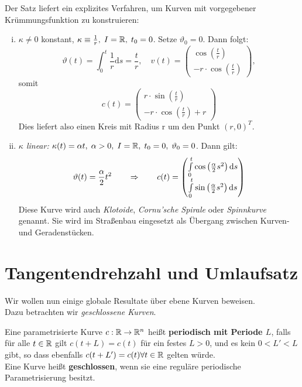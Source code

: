 \documentclass[11pt]{scrbook}
\begin{document}
Der Satz liefert ein explizites Verfahren, um Kurven mit vorgegebener Krümmungsfunktion zu konstruieren:

\begin{ex}
\begin{enumerate}[i)]
	\item
	 $\kappa \neq 0$ konstant, $\kappa \equiv \frac{1}{r}, \; I = \mathbb{R}, \; t_0 = 0$. Setze $\vartheta_0 = 0$. Dann folgt:
	 \[
	 \vartheta(t)=\int_0^t \frac{1}{r} \mathrm d s= \frac{t}{r}, \quad v(t)=\begin{pmatrix} \cos\left (\frac{t}{r}\right ) \\ -r \cdot \cos\left ( \frac t r \right ) \end{pmatrix},
	 \]
	 somit 
	 \[
	 c(t)=\begin{pmatrix} r \cdot \sin\left ( \frac t r \right ) \\ -r \cdot \cos \left ( \frac t r \right ) +r \end{pmatrix}
	 \]
	 Dies liefert also einen Kreis mit Radius r um den Punkt $(r,0)^T$.
	 
	 \item \emph{ $\kappa$ linear:} $\kappa (t) = \alpha t, \; \alpha > 0, \; I = \mathbb{R}, \; t_0 = 0, \; \vartheta_0 = 0$. Dann gilt: 
	 \[ \vartheta(t) = \frac{\alpha}{2} t^2 \qquad \Rightarrow \qquad c(t) = \begin{pmatrix} \int\limits_0^t \cos \left (\frac{\alpha}{2} s^2 \right ) \mathrm d s \\ \int\limits_0^t \sin \left (\frac{\alpha}{2} s^2 \right ) \mathrm d s \end{pmatrix}
	 \]
	 Diese Kurve wird auch \emph{Klotoide}, \emph{Cornu'sche Spirale} oder \emph{Spinnkurve} genannt. Sie wird im Straßenbau eingesetzt als Übergang zwischen Kurven- und Geradenstücken.  
\end{enumerate}
\end{ex}

\section{Tangentendrehzahl und Umlaufsatz}
Wir wollen nun einige globale Resultate über ebene Kurven beweisen. \\
Dazu betrachten wir \emph{geschlossene Kurven}. \\
\fixme[Bilder]

\begin{df}
Eine parametrisierte Kurve $c: \mathbb{R} \to \mathbb{R}^n$ heißt \textbf{periodisch mit Periode $L$}, falls für alle $t \in \mathbb{R}$ gilt $c(t+L) = c(t)$ für ein festes $L > 0$, und es kein $ 0 < L' < L$ gibt, so dass ebenfalls $c(t+L') = c(t) \forall t \in \mathbb{R}$ gelten würde. \\
Eine Kurve heißt \textbf{geschlossen}, wenn sie eine reguläre periodische Parametrisierung besitzt.
\end{df}
\end{document}
